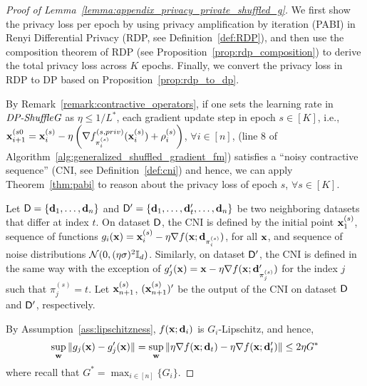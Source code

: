 \begin{proof}[Proof of Lemma~\ref{lemma:appendix_privacy_private_shuffled_g}]
    We first show the privacy loss per epoch by using privacy amplification by iteration (PABI) in Renyi Differential Privacy (RDP, see Definition~\ref{def:RDP}), and then use the composition theorem of RDP (see Proposition~\ref{prop:rdp_composition}) to derive the total privacy loss across $K$ epochs. Finally, we convert the privacy loss in RDP to DP based on Proposition~\ref{prop:rdp_to_dp}. 

    By Remark~\ref{remark:contractive_operators}, if one sets the learning rate in $\textit{DP-ShuffleG}$ as $\eta \leq 1/L^{*}$, each gradient update step in epoch $s\in [K]$, i.e., ${\mathbf{x}}_{i+1}^{(s0} = {\mathbf{x}}_{i}^{(s)} - \eta \left(\nabla f_{\pi_i^{(s)}}^{(s, priv)}({\mathbf{x}}_i^{(s)}) + \rho_i^{(s)} \right)$, $\forall i\in [n]$, (line 8 of Algorithm~\ref{alg:generalized_shuffled_gradient_fm}) satisfies a ``noisy contractive sequence'' (CNI, see Definition~\ref{def:cni}) and hence, we can apply Theorem~\ref{thm:pabi} to reason about the privacy loss of epoch $s$, $\forall s\in[K]$.

    Let ${\mathsf{D}} = \{{\mathbf{d}}_1, \dots, {\mathbf{d}}_n\}$ and ${\mathsf{D}}' = \{{\mathbf{d}}_1, \dots, {\mathbf{d}}_{t}', \dots, {\mathbf{d}}_n\}$ be two neighboring datasets that differ at index $t$. 
    On dataset ${\mathsf{D}}$, the CNI is defined by the initial point ${\mathbf{x}}_1^{(s)}$, sequence of functions $g_i({\mathbf{x}}) = {\mathbf{x}}_i^{(s)} - \eta \nabla f({\mathbf{x}}; {\mathbf{d}}_{\pi_i^{(s)}})$, for all ${\mathbf{x}}$, and sequence of noise distributions ${\mathcal{N}}(0, (\eta \sigma)^2 {\mathbb{I}}_d)$. Similarly, on dataset ${\mathsf{D}}'$, the CNI is defined 
    in the same way with the exception of $g_j'({\mathbf{x}}) = {\mathbf{x}} - \eta \nabla f({\mathbf{x}}; {\mathbf{d}}_{\pi_j^{(s)}}')$ for the index $j$ such that $\pi_j^{(s)} = t$. 
    Let ${\mathbf{x}}_{n+1}^{(s)}$, $({\mathbf{x}}_{n+1}^{(s)})'$ be the output of the CNI on dataset ${\mathsf{D}}$ and ${\mathsf{D}}'$, respectively.
    
    By Assumption~\ref{ass:lipschitzness}, $f({\mathbf{x}}; {\mathbf{d}}_i)$ is $G_i$-Lipschitz, and hence,
    \begin{align*}
        \sup_{{\mathbf{w}}}\| g_j({\mathbf{x}}) - g_j'({\mathbf{x}}) \| = \sup_{{\mathbf{w}}}\| \eta \nabla f({\mathbf{x}}; {\mathbf{d}}_{t}) - \eta \nabla f({\mathbf{x}}; {\mathbf{d}}_{t}') \| \leq 2 \eta G^{*}    
    \end{align*}
    where recall that $G^{*} = \max_{i\in [n]} \{G_i\}$.


\end{proof}
